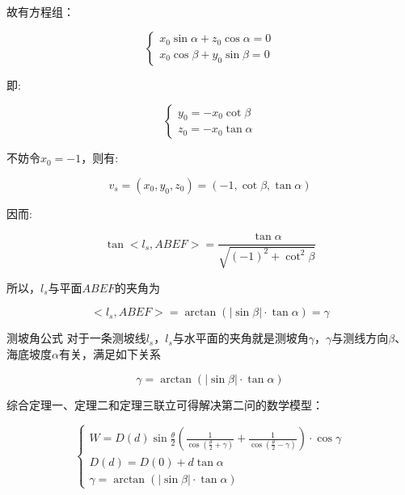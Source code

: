 故有方程组：

\begin{equation}
    \begin{cases}
        x_0\sin\alpha + z_0\cos\alpha = 0 \\
        x_0\cos\beta + y_0 \sin\beta = 0
    \end{cases}
\end{equation}

即:

\begin{equation*}
    \begin{cases}
        y_0 = -x_0 \cot \beta \\
        z_0 = -x_0 \tan \alpha
    \end{cases}
\end{equation*}

不妨令$x_0 = -1$，则有:

\begin{equation}
    v_s
    = (x_0, y_0, z_0)
    = \left(
    -1,
    \cot \beta,
    \tan \alpha
    \right)
\end{equation}

因而:

\begin{equation*}
    \tan <l_s, ABEF>
    = \frac {\tan \alpha} {\sqrt{(-1)^2 + \cot ^2 \beta}}
\end{equation*}

所以，$l_s$与平面$ABEF$的夹角为

\begin{equation}
    <l_s, ABEF>
    = \arctan \left(|\sin \beta| \cdot  \tan \alpha\right)
    = \gamma
\end{equation}

\begin{mcmTheorem}{测坡角公式}
    \label{theorem:测坡角公式}
    对于一条测坡线$l_s$，$l_s$与水平面的夹角就是测坡角$\gamma$，$\gamma$与测线方向$\beta$、海底坡度$\alpha$有关，满足如下关系

    \begin{equation}
        \gamma = \arctan(|\sin\beta| \cdot \tan\alpha)
    \end{equation}
\end{mcmTheorem}


综合定理一、定理二和定理三联立可得解决第二问的数学模型：

\begin{equation}
    \begin{cases}
        W =
        D(d)\sin\frac{\theta}{2}\left(\frac{1}{\cos(\frac{\theta}{2}+\gamma)} + \frac{1}{\cos(\frac{\theta}{2}-\gamma)}\right) \cdot \cos \gamma   \\
        D(d) = D(0) + d\tan\alpha \\
        \gamma = \arctan(|\sin\beta| \cdot \tan\alpha)
    \end{cases}
\end{equation}

